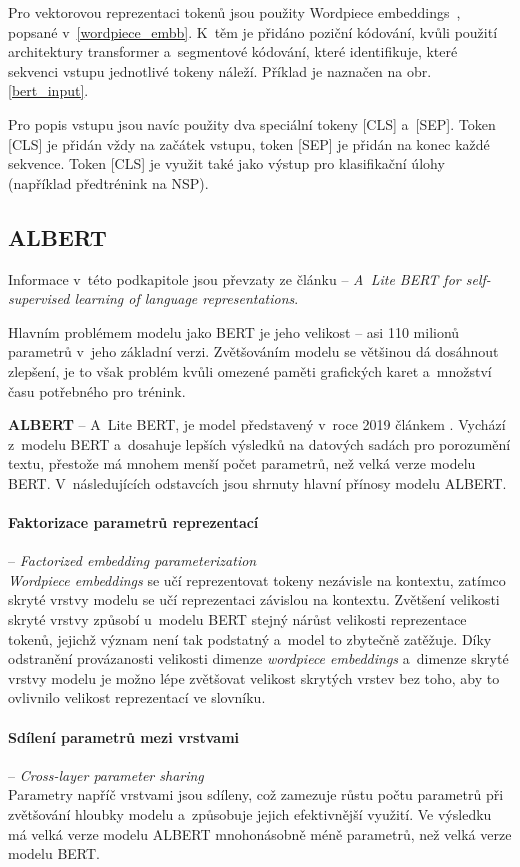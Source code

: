 Pro vektorovou reprezentaci tokenů jsou použity Wordpiece embeddings~\cite{wordpiece}, popsané v~\ref{wordpiece_embb}. K~těm je přidáno poziční kódování, kvůli použití architektury transformer a~segmentové kódování, které identifikuje, které sekvenci vstupu jednotlivé tokeny náleží. Příklad je naznačen na obr. \ref{bert_input}.\par
Pro popis vstupu jsou navíc použity dva speciální tokeny [CLS] a~[SEP]. Token [CLS] je přidán vždy na začátek vstupu, token [SEP] je přidán na konec každé sekvence. Token [CLS] je využit také jako výstup pro klasifikační úlohy (například předtrénink na NSP).

\subsection{ALBERT}
Informace v~této podkapitole jsou převzaty ze článku \cite{ALBERT} -- \emph{A~Lite BERT for self-supervised learning of language representations}.\par
Hlavním problémem modelu jako BERT je jeho velikost -- asi 110 milionů parametrů v~jeho základní verzi. Zvětšováním modelu se většinou dá dosáhnout zlepšení, je to však problém kvůli omezené paměti grafických karet a~množství času potřebného pro trénink.\par
\textbf{ALBERT} -- A~Lite BERT, je model představený v~roce 2019 článkem \cite{ALBERT}. Vychází z~modelu BERT a~dosahuje lepších výsledků na datových sadách pro porozumění textu, přestože má mnohem menší počet parametrů, než velká verze modelu BERT. V~následujících odstavcích jsou shrnuty hlavní přínosy modelu ALBERT.

\paragraph{Faktorizace parametrů reprezentací} -- \emph{Factorized embedding parameterization}\\ 
\emph{Wordpiece embeddings} se učí reprezentovat tokeny nezávisle na kontextu, zatímco skryté vrstvy modelu se učí reprezentaci závislou na kontextu. Zvětšení velikosti skryté vrstvy způsobí u~modelu BERT stejný nárůst velikosti reprezentace tokenů, jejichž význam není tak podstatný a~model to zbytečně zatěžuje.
Díky odstranění provázanosti velikosti dimenze \emph{wordpiece embeddings} a~dimenze skryté vrstvy modelu je možno lépe zvětšovat velikost skrytých vrstev bez toho, aby to ovlivnilo velikost reprezentací ve slovníku.

\paragraph{Sdílení parametrů mezi vrstvami} -- \textit{Cross-layer parameter sharing}\\
Parametry napříč vrstvami jsou sdíleny, což zamezuje růstu počtu parametrů při zvětšování hloubky modelu a~způsobuje jejich efektivnější využití. Ve výsledku má velká verze modelu ALBERT mnohonásobně méně parametrů, než velká verze modelu BERT.

